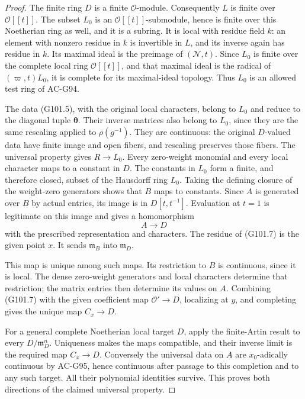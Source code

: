 \begin{proof}
The finite ring \(D\) is a finite \(\mathcal O\)-module.
Consequently \(L\) is finite over \(\mathcal O[[t]]\).
The subset \(L_0\) is an \(\mathcal O[[t]]\)-submodule, hence
is finite over this Noetherian ring as well, and it is a subring.
It is local with residue field \(k\):
an element with nonzero residue in \(k\) is invertible in \(L\),
and its inverse again has residue in \(k\).
Its maximal ideal is the preimage of \((\mathcal N,t)\).
Since \(L_0\) is finite over the complete local ring
\(\mathcal O[[t]]\), and that maximal ideal is the radical of
\((\varpi,t)L_0\), it is complete for its maximal-ideal topology.
Thus \(L_0\) is an allowed test ring of AC-G94.

The data (G101.5), with the original local characters, belong to
\(L_0\) and reduce to the diagonal tuple \(\boldsymbol\theta\).
Their inverse matrices also belong to \(L_0\), since they are
the same rescaling applied to \(\rho(g^{-1})\).
They are continuous: the original \(D\)-valued data have finite
image and open fibers, and rescaling preserves those fibers.
The universal property gives \(R\to L_0\).
Every zero-weight monomial and every local character maps to a
constant in \(D\).  The constants in \(L_0\) form a finite, and
therefore closed, subset of the Hausdorff ring \(L_0\).
Taking the defining closure of the weight-zero generators shows
that \(B\) maps to constants.
Since \(A\) is generated over \(B\) by actual entries, its image
is in \(D[t,t^{-1}]\).  Evaluation at \(t=1\) is legitimate
on this image and gives a homomorphism
\[
                         A\longrightarrow D
 \tag{G101.7}
\]
with the prescribed representation and characters.
The residue of (G101.7) is the given point \(x\).
It sends \(\mathfrak m_B\) into \(\mathfrak m_D\).

This map is unique among such maps.
Its restriction to \(B\) is continuous, since it is local.
The dense zero-weight generators and local characters determine
that restriction; the matrix entries then determine its values
on \(A\).  Combining (G101.7) with the given coefficient map
\(\mathcal O'\to D\), localizing at \(y\), and completing gives
the unique map \(C_x\to D\).

For a general complete Noetherian local target \(D\), apply the
finite-Artin result to every \(D/\mathfrak m_D^n\).
Uniqueness makes the maps compatible, and their inverse limit
is the required map \(C_x\to D\).  Conversely the universal data
on \(A\) are \(x_0\)-adically continuous by AC-G95, hence
continuous after passage to this completion and to any such
target.  All their polynomial identities survive.
This proves both directions of the claimed universal property.
\end{proof}

